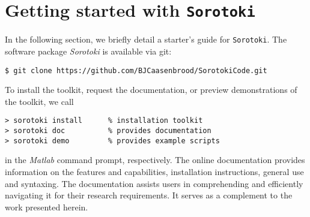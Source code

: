 \section{Getting started with \texttt{Sorotoki}}
\label{sec:C5:open_softrobots}
In the following section, we briefly detail a starter's guide for \texttt{Sorotoki}. The software package \textit{Sorotoki} is available via git:
%
\begin{lstlisting}[style=terminal]
$ git clone https://github.com/BJCaasenbrood/SorotokiCode.git
\end{lstlisting}
%
To install the toolkit, request the documentation, or preview demonstrations of the toolkit, we call 
%
\begin{lstlisting}[style=Matlabterminal]
> sorotoki install      % installation toolkit
> sorotoki doc          % provides documentation
> sorotoki demo         % provides example scripts
\end{lstlisting}
%
in the \textit{Matlab} command prompt, respectively. The online documentation provides information on the features and capabilities, installation instructions, general use and syntaxing. The documentation assists users in comprehending and efficiently navigating it for their research requirements. It serves as a complement to the work presented herein.